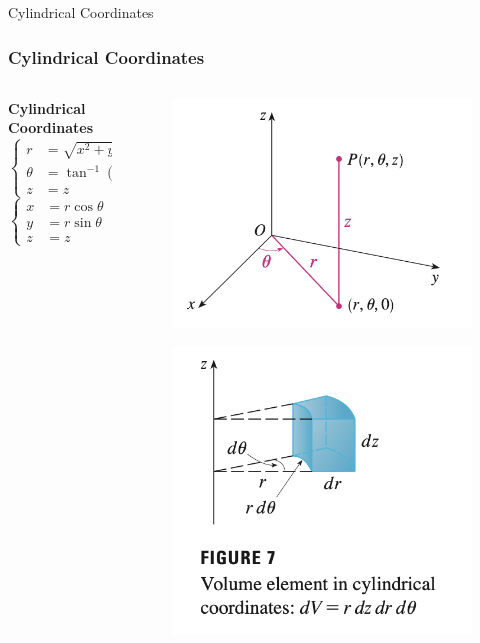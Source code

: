 \documentclass[aspectratio=169, UTF8]{beamer}
\begin{document}
\begin{frame}{Cylindrical Coordinates}
    \frametitle{Cylindrical Coordinates}
\begin{columns}
    \begin{column}{0.3\textwidth}
        \textbf{Cylindrical Coordinates} \\
        $\begin{cases}
            r &= \sqrt{x^2 + y^2} \\
            \theta &= \tan^{-1}\left(\frac{y}{x}\right) \\
            z &= z
        \end{cases}$
        \\
        $\begin{cases}
            x &= r\cos\theta \\
            y &= r\sin\theta \\
            z &= z
        \end{cases}$
    \end{column}
    
    \begin{column}{0.7\textwidth}
        \begin{figure}
            \centering
            \includegraphics[width=0.45\linewidth]{cc_1.png}
        \end{figure}
        \begin{figure}
            \centering
            \includegraphics[width=0.45\linewidth]{cc_2.png}
        \end{figure}
    \end{column}
\end{columns}

\end{frame}
\end{document}
